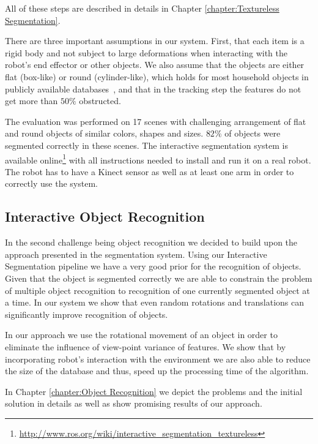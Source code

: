 All of these steps are described in details in Chapter \ref{chapter:Textureless Segmentation}. 


There are three important assumptions in our system. First, that each item is a rigid  body and not subject
to large deformations when  interacting with  the robot's  end  effector or
other objects. We also assume that the objects are either flat (box-like) or round (cylinder-like),
which holds for most household objects in publicly available databases~\cite{marton11ijrr}, and
that in the tracking step the features do not get more than $50\%$ obstructed.

The evaluation was performed on 17 scenes with challenging arrangement of flat and
round objects of similar colors, shapes and sizes. $82\%$ of objects
were segmented correctly in these scenes. The interactive segmentation system is available online\footnote{\url{http://www.ros.org/wiki/interactive_segmentation_textureless}} with all instructions needed to install and run it on a real robot. The robot has to have a Kinect sensor as well as at least one arm in order to correctly use the system.

\subsection{Interactive Object Recognition} 

In the second challenge being object recognition we decided to build upon the approach presented in the segmentation system. Using our Interactive Segmentation pipeline we have a very good prior for the recognition of objects. Given that the object is segmented correctly we are able to constrain the problem of multiple object recognition to recognition of one currently segmented object at a time. In our system we show that even random rotations and translations can significantly improve recognition of objects.

In our approach we use the rotational movement of an object in order to eliminate the influence of view-point variance of features. We show that by incorporating robot's interaction with the environment we are also able to reduce the size of the database and thus, speed up the processing time of the algorithm.

In Chapter \ref{chapter:Object Recognition} we depict the problems and the initial solution in details as well as show promising results of our approach.
    















